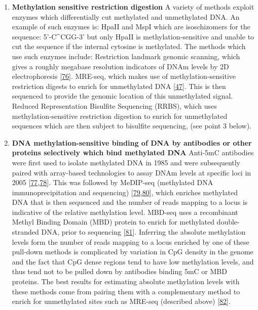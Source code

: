 \documentclass[
]{book}
\begin{document}
\begin{enumerate}
\def\labelenumi{\arabic{enumi}.}
\item
  \textbf{Methylation sensitive restriction digestion}
  A variety of methods exploit enzymes which differentially cut methylated and unmethylated DNA.
  An example of such enzymes is: HpaII and MspI which are isoschizomers for the sequence: 5'-C\^{}CGG-3' but only HpaII is methylation-sensitive and unable to cut the sequence if the internal cytosine is methylated.
  The methods which use such enzymes include: Restriction landmark genomic scanning, which gives a roughly megabase resolution indicators of DNAm levels by 2D electrophoresis {[}\protect\hyperlink{ref-Hatada1991}{76}{]}.
  MRE-seq, which makes use of methylation-sensitive restriction digests to enrich for unmethylated DNA {[}\protect\hyperlink{ref-Maunakea2010}{47}{]}.
  This is then sequenced to provide the genomic location of this unmethylated signal.
  Reduced Representation Bisulfite Sequencing (RRBS), which uses methylation-sensitive restriction digestion to enrich for unmethylated sequences which are then subject to bisulfite sequencing, (see point 3 below).
\item
  \textbf{DNA methylation-sensitive binding of DNA by antibodies or other proteins selectively which bind methylated DNA}
  Anti-5mC antibodies were first used to isolate methylated DNA in 1985 and were subsequently paired with array-based technologies to assay DNAm levels at specific loci in 2005 {[}\protect\hyperlink{ref-Weber2005}{77},\protect\hyperlink{ref-Harrison2011}{78}{]}.
  This was followed by MeDIP-seq (methylated DNA immunoprecipitation and sequencing) {[}\protect\hyperlink{ref-Down2009}{79},\protect\hyperlink{ref-Lienhard2014}{80}{]}, which enriches methylated DNA that is then sequenced and the number of reads mapping to a locus is indicative of the relative methylation level.
  MBD-seq uses a recombinant Methyl Binding Domain (MBD) protein to enrich for methylated double-stranded DNA, prior to sequencing {[}\protect\hyperlink{ref-Serre2009a}{81}{]}.
  Inferring the absolute methylation levels form the number of reads mapping to a locus enriched by one of these pull-down methods is complicated by variation in CpG density in the genome and the fact that CpG dense regions tend to have low methylation levels, and thus tend not to be pulled down by antibodies binding 5mC or MBD proteins.
  The best results for estimating absolute methylation levels with these methods come from pairing them with a complementary method to enrich for unmethylated sites such as MRE-seq (described above) {[}\protect\hyperlink{ref-Li2015}{82}{]}.

\end{enumerate}
\end{document}
